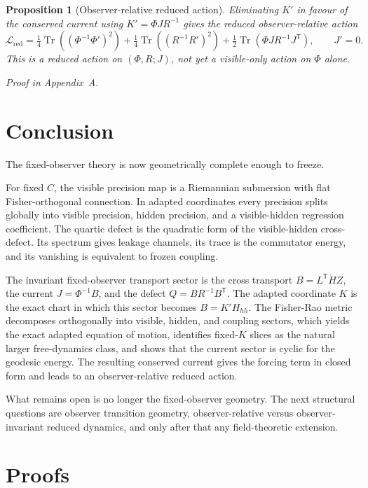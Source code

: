 \documentclass[11pt,a4paper]{article}
\numberwithin{equation}{section}
\DeclareMathOperator{\Tr}{Tr}
\theoremstyle{thmcompact}
\newtheorem{proposition}[theorem]{Proposition}
\theoremstyle{remark}
\newcommand{\proofappendix}{\par{\hfill\scriptsize\emph{Proof in Appendix~A.}}\par}
\begin{document}
\begin{proposition}[Observer-relative reduced action]
\label{prop:reduced-action}
Eliminating $K'$ in favour of the conserved current using $K'=\Phi J R^{-1}$ gives the reduced observer-relative action
\begin{equation}
\mathcal L_{\mathrm{red}}
=
\tfrac14\Tr((\Phi^{-1}\Phi')^2)
+
\tfrac14\Tr((R^{-1}R')^2)
+
\tfrac12\Tr(\Phi J R^{-1}J^{\mathsf T}),
\qquad
J'=0.
\label{eq:reduced-action}
\end{equation}
This is a reduced action on $(\Phi,R;J)$, not yet a visible-only action on $\Phi$ alone.
\end{proposition}

\proofappendix

\section{Conclusion}

The fixed-observer theory is now geometrically complete enough to freeze.

For fixed $C$, the visible precision map is a Riemannian submersion with flat Fisher-orthogonal connection. In adapted coordinates every precision splits globally into visible precision, hidden precision, and a visible-hidden regression coefficient. The quartic defect is the quadratic form of the visible-hidden cross-defect. Its spectrum gives leakage channels, its trace is the commutator energy, and its vanishing is equivalent to frozen coupling.

The invariant fixed-observer transport sector is the cross transport $B=L^{\mathsf T}\dot H Z$, the current $J=\Phi^{-1}B$, and the defect $Q=BR^{-1}B^{\mathsf T}$. The adapted coordinate $K$ is the exact chart in which this sector becomes $B=K'H_{hh}$. The Fisher-Rao metric decomposes orthogonally into visible, hidden, and coupling sectors, which yields the exact adapted equation of motion, identifies fixed-$K$ slices as the natural larger free-dynamics class, and shows that the current sector is cyclic for the geodesic energy. The resulting conserved current gives the forcing term in closed form and leads to an observer-relative reduced action.

What remains open is no longer the fixed-observer geometry. The next structural questions are observer transition geometry, observer-relative versus observer-invariant reduced dynamics, and only after that any field-theoretic extension.

\appendix
\section{Proofs}
\end{document}
